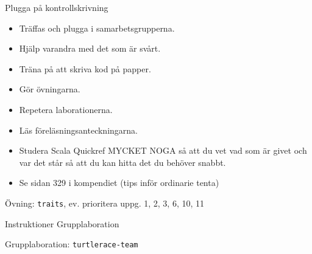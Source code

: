 \begin{Slide}{Plugga på kontrollskrivning}
\begin{itemize}
\item Träffas och plugga i samarbetsgrupperna.
\item Hjälp varandra med det som är svårt.
\item Träna på att skriva kod på papper.
\item Gör övningarna.
\item Repetera laborationerna.
\item Läs föreläsningsanteckningarna.
\item Studera Scala Quickref MYCKET NOGA så att du vet vad som är givet och var det står så att du kan hitta det du behöver snabbt.
\item Se sidan 329 i kompendiet (tips inför ordinarie tenta)
\end{itemize}
\end{Slide}









\begin{Slide}{Övning: \texttt{traits}, ev. prioritera uppg. 1, 2, 3, 6, 10, 11}
\begin{itemize}\SlideFontTiny

\end{itemize}
\end{Slide}

\begin{Slide}{Instruktioner Grupplaboration}
\begin{itemize}\SlideFontSmall

\end{itemize}
\end{Slide}

\begin{Slide}{Grupplaboration: \texttt{turtlerace-team}}
\begin{itemize}

\end{itemize}
\end{Slide}



\fi
